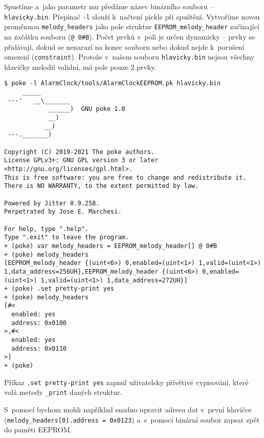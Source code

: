 Spustíme  a~jako parametr mu předáme název binárního souboru~--
\texttt{hlavicky.bin}. Přepínač \texttt{-l} slouží k~načtení pickle při
spuštění. Vytvoříme novou proměnnou \verb|melody_headers| jako pole struktur
\verb|EEPROM_melody_header| začínající na začátku souboru (\verb|@ 0#B|). Počet
prvků v~poli je určen dynamicky -- prvky se přidávají, dokud se nenarazí na
konec souboru nebo dokud nejde k~porušení omezení (\texttt{constraint}).
Protože v~našem souboru \texttt{hlavicky.bin} nejsou všechny hlavičky melodií
validní, má pole pouze 2 prvky.
\begin{lstlisting}[style=terminal]
$ poke -l AlarmClock/tools/AlarmClockEEPROM.pk hlavicky.bin
     _____
 ---'   __\_______
            ______)  GNU poke 1.0
            __)
           __)
 ---._______)

Copyright (C) 2019-2021 The poke authors.
License GPLv3+: GNU GPL version 3 or later <http://gnu.org/licenses/gpl.html>.
This is free software: you are free to change and redistribute it.
There is NO WARRANTY, to the extent permitted by law.

Powered by Jitter 0.9.258.
Perpetrated by Jose E. Marchesi.

For help, type ".help".
Type ".exit" to leave the program.
+ (poke) var melody_headers = EEPROM_melody_header[] @ 0#B
+ (poke) melody_headers
[EEPROM_melody_header {(uint<6>) 0,enabled=(uint<1>) 1,valid=(uint<1>) 1,data_address=256UH},EEPROM_melody_header {(uint<6>) 0,enabled=(uint<1>) 1,valid=(uint<1>) 1,data_address=272UH}]
+ (poke) .set pretty-print yes
+ (poke) melody_headers
[#<
  enabled: yes
  address: 0x0100
>,#<
  enabled: yes
  address: 0x0110
>]
+ (poke)
\end{lstlisting}
Příkaz \verb|.set pretty-print yes| zapnul uživatelsky přívětivé vypisování,
které volá metody \verb|_print| daných struktur.

S~pomocí  bychom mohli například snadno upravit adresu dat
v~první hlavičce (\lstinline[language=Poke]|melody_headers[0].address = 0x0123|)
a~s~pomocí  binární soubor zapsat zpět do paměti
EEPROM.



